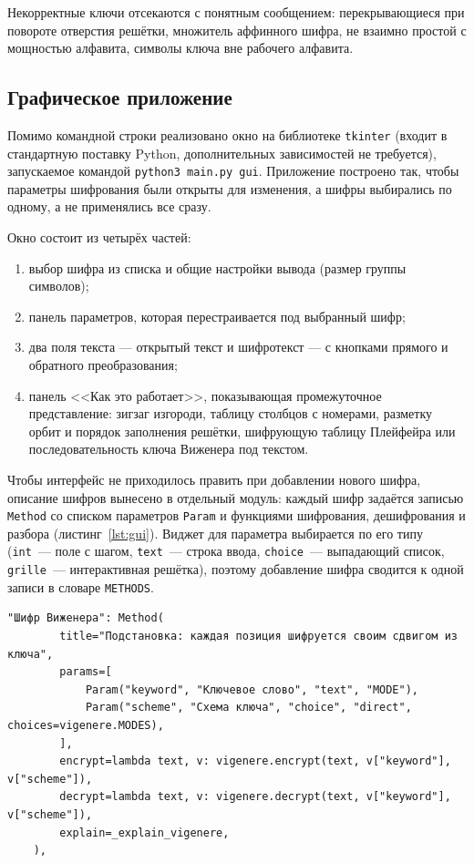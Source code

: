 \documentclass[14pt,a4paper]{extarticle}
\begin{document}
Некорректные ключи отсекаются с понятным сообщением: перекрывающиеся при повороте
отверстия решётки, множитель аффинного шифра, не взаимно простой с мощностью алфавита,
символы ключа вне рабочего алфавита.


\subsection{Графическое приложение}

Помимо командной строки реализовано окно на библиотеке \texttt{tkinter} (входит в
стандартную поставку Python, дополнительных зависимостей не требуется), запускаемое
командой \texttt{python3 main.py gui}. Приложение построено так, чтобы параметры
шифрования были открыты для изменения, а шифры выбирались по одному, а не применялись
все сразу.

Окно состоит из четырёх частей:
\begin{enumerate}
\item выбор шифра из списка и общие настройки вывода (размер группы символов);
\item панель параметров, которая перестраивается под выбранный шифр;
\item два поля текста --- открытый текст и шифротекст --- с кнопками прямого и
обратного преобразования;
\item панель <<Как это работает>>, показывающая промежуточное представление:
зигзаг изгороди, таблицу столбцов с номерами, разметку орбит и порядок заполнения
решётки, шифрующую таблицу Плейфейра или последовательность ключа Виженера под текстом.
\end{enumerate}

Чтобы интерфейс не приходилось править при добавлении нового шифра, описание шифров
вынесено в отдельный модуль: каждый шифр задаётся записью \texttt{Method} со списком
параметров \texttt{Param} и функциями шифрования, дешифрования и разбора
(листинг~\ref{lst:gui}). Виджет для параметра выбирается по его типу
(\texttt{int}~--- поле с шагом, \texttt{text}~--- строка ввода, \texttt{choice}~---
выпадающий список, \texttt{grille}~--- интерактивная решётка), поэтому добавление
шифра сводится к одной записи в словаре \texttt{METHODS}.

\begin{lstlisting}[style=python, caption={Описание шифра для интерфейса}, label={lst:gui}]
    "Шифр Виженера": Method(
        title="Подстановка: каждая позиция шифруется своим сдвигом из ключа",
        params=[
            Param("keyword", "Ключевое слово", "text", "MODE"),
            Param("scheme", "Схема ключа", "choice", "direct", choices=vigenere.MODES),
        ],
        encrypt=lambda text, v: vigenere.encrypt(text, v["keyword"], v["scheme"]),
        decrypt=lambda text, v: vigenere.decrypt(text, v["keyword"], v["scheme"]),
        explain=_explain_vigenere,
    ),
\end{lstlisting}
\end{document}
